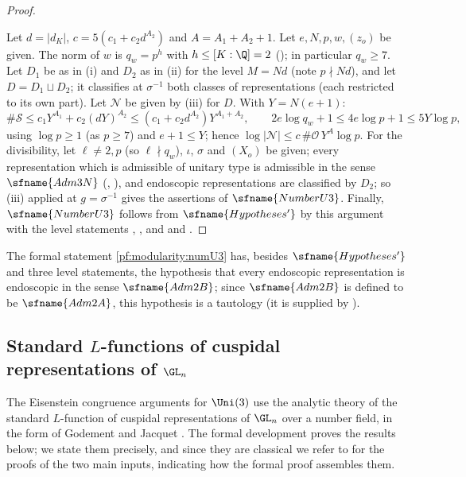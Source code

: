 \begin{proof}
\begin{enumerate}[label=(\roman*)]
\end{enumerate}
Let $d=|d_K|$, $c=5(c_1+c_2d^{A_2})$ and $A=A_1+A_2+1$. Let $e,N,p,w,(z_o)$ be given. The norm of $w$ is $q_w=p^h$ with
$h\le[K:\Q]=2$ (); in particular $q_w\ge7$. Let $D_1$ be as in
(i) and $D_2$ as in (ii) for the level $M=Nd$ (note $p\nmid Nd$), and let $D=D_1\sqcup D_2$; it classifies at $\sigma^{-1}$
both classes of representations (each restricted to its own part). Let $\mathcal N$ be given by (iii) for $D$. With
$Y=N(e+1)$:
\[
 \#\mathcal S\le c_1Y^{A_1}+c_2(dY)^{A_2}\le(c_1+c_2d^{A_2})Y^{A_1+A_2},\qquad 2e\log q_w+1\le4e\log p+1\le5Y\log p,
\]
using $\log p\ge1$ (as $p\ge7$) and $e+1\le Y$; hence $\log|\mathcal N|\le c\,\#\mathcal O\,Y^{A}\log p$. For the
divisibility, let $\ell\ne2,p$ (so $\ell\nmid q_w$), $\iota$, $\sigma$ and $(X_o)$ be given; every representation which is
admissible of unitary type is admissible in the sense $\sfname{Adm3N}$ (,
), and endoscopic representations are classified by $D_2$; so (iii) applied at
$g=\sigma^{-1}$ gives the assertions of $\sfname{NumberU3}$. Finally, $\sfname{NumberU3}$ follows from
$\sfname{Hypotheses'}$ by this argument with the level statements
, , and 
and .
\end{proof}

\begin{remark}\label{pf:modularity:rem-numU3}
The formal statement \cref{pf:modularity:numU3} has, besides $\sfname{Hypotheses'}$ and three level statements, the
hypothesis that every endoscopic representation is endoscopic in the sense $\sfname{Adm2B}$; since $\sfname{Adm2B}$ is
defined to be $\sfname{Adm2A}$, this hypothesis is a tautology (it is supplied by
).
\end{remark}

\subsection{Standard \texorpdfstring{$L$}{L}-functions of cuspidal representations of \texorpdfstring{$\GL_n$}{GL(n)}}\label{sec:pf:modularity:GJ}

The Eisenstein congruence arguments for $\Uni(3)$ use the analytic theory of the standard $L$-function of cuspidal
representations of $\GL_n$ over a number field, in the form of Godement and Jacquet \cite{GodementJacquet1972}. The
formal development proves the results below; we state them precisely, and since they are classical we refer to
\cite{GodementJacquet1972} for the proofs of the two main inputs, indicating how the formal proof assembles them.


